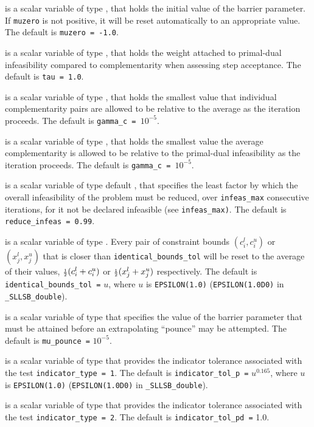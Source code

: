 \documentclass{galahad}
\newcommand{\packagename}{SLLSB}
\newcommand{\fullpackagename}{\libraryname\_\packagename}
\begin{document}
\begin{description}
  is a scalar variable of type \realdp, that holds the
initial value of the barrier parameter. If {\tt muzero} is
not positive, it will be reset automatically to an appropriate value.
The default is {\tt muzero = -1.0}.

  is a scalar variable of type \realdp, that holds the
weight attached to primal-dual infeasibility compared to complementarity
when assessing step acceptance.
The default is {\tt tau = 1.0}.

  is a scalar variable of type \realdp, that holds the
smallest value that individual complementarity pairs are allowed
to be relative to the average as the iteration proceeds.
The default is {\tt gamma\_c = $10^{-5}$}.

  is a scalar variable of type \realdp, that holds the
smallest value the average complementarity is allowed
to be relative to the primal-dual infeasibility as the iteration proceeds.
The default is {\tt gamma\_c = $10^{-5}$}.

  is a scalar variable of type default
\realdp, that specifies the
least factor by which the overall infeasibility of the problem must be reduced,
over {\tt infeas\_max} consecutive iterations,
for it not be declared infeasible (see {\tt infeas\_max)}.
The default is {\tt reduce\_infeas = 0.99}.

is a scalar variable of type \realdp.
Every pair of constraint bounds
$(c_{i}^{l}, c_{i}^{u})$ or $(x_{j}^{l}, x_{j}^{u})$
that is closer than {\tt identical\_bounds\_tol}
will be reset to the average of their values,
${\scriptstyle \frac{1}{2}} (c_{i}^{l} + c_{i}^{u})$ or ${\scriptstyle \frac{1}{2}} (x_{j}^{l} + x_{j}^{u})$
respectively.
The default is {\tt identical\_bounds\_tol =} $u$,
where $u$ is {\tt EPSILON(1.0)} ({\tt EPSILON(1.0D0)} in
{\tt \fullpackagename\_double}).

is a scalar variable of type \realdp that specifies
the value of the barrier parameter that must be attained before an 
extrapolating ``pounce'' may be attempted.
The default is {\tt mu\_pounce =} $10^{-5}$.

is a scalar variable of type \realdp that
provides the indicator tolerance associated with the test
{\tt indicator\_type = 1}.
The default is {\tt indicator\_tol\_p =} $u^{0.165}$,
where $u$ is {\tt EPSILON(1.0)} ({\tt EPSILON(1.0D0)} in
{\tt \fullpackagename\_double}).

is a scalar variable of type \realdp that
provides the indicator tolerance associated with the test
{\tt indicator\_type = 2}.
The default is {\tt indicator\_tol\_pd =} 1.0.


\end{description}
\end{document}
